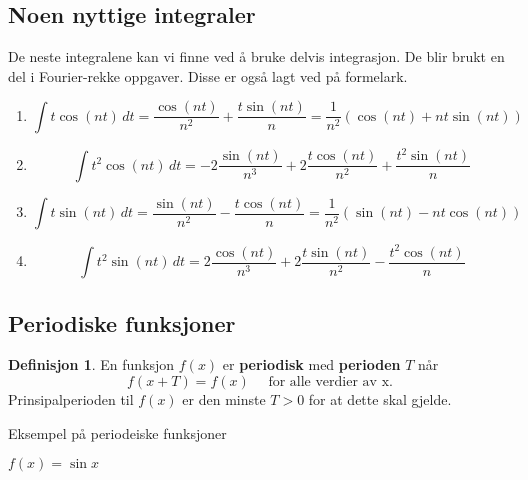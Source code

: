 \documentclass[11pt]{article}
\theoremstyle{definition}
\newtheorem{mindef}{Definisjon}[section]
\newenvironment{fmindef}
{\begin{mdframed}[style=minstil]\begin{mindef}}
		{\end{mindef}\end{mdframed}}
\theoremstyle{definition}
\theoremstyle{definition}
\theoremstyle{definition}
\theoremstyle{definition}
\theoremstyle{definition}
\begin{document}
		\newpage
		
		\subsection{Noen nyttige integraler}
		
		De neste integralene kan vi finne ved å bruke delvis integrasjon. De blir brukt en del i Fourier-rekke oppgaver. Disse er også lagt ved på formelark.
		
		\begin{enumerate}
			\item \[\int t \cos (nt) \,dt=\dfrac{\cos (nt)}{n^2}+\dfrac{t \sin (nt)}{n}=\dfrac{1}{n^2}(\cos (nt) +nt \sin (nt)) \]
			\item
			\[\int t^2 \cos(nt)\,dt=-2\dfrac{\sin(nt)}{n^3}+2\dfrac{t\cos(nt)}{n^2}+\dfrac{t^2\sin(nt)}{n} \]
			\item 
			\[\int t \sin (nt) \,dt=\dfrac{\sin (nt)}{n^2}-\dfrac{t \cos (nt)}{n}=\dfrac{1}{n^2}(\sin (nt) - nt \cos (nt)) \]
			\item
			\[\int t^2 \sin(nt)\,dt=2\dfrac{\cos(nt)}{n^3}+2\dfrac{t\sin(nt)}{n^2}-\dfrac{t^2\cos(nt)}{n} \]
		\end{enumerate}
		
		
		
		\newpage
		
		\subsection{Periodiske funksjoner}
				
		\begin{fmindef}
			En funksjon \(f(x)\) er \textbf{periodisk} med \textbf{perioden} \(T\) når 
			\[f(x+T)=f(x) \hspace{16pt} \text{for alle verdier av x.} \]
			Prinsipalperioden til \(f(x)\) er den minste \(T>0\) for at dette skal gjelde.
		\end{fmindef}
		
		Eksempel på periodeiske funksjoner
		
		\(f(x)=\sin x \) 
		
\end{document}
